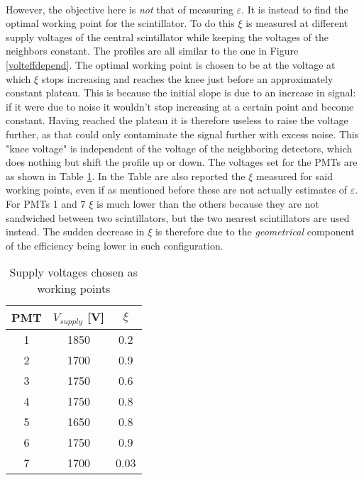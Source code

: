 \documentclass[10pt,a4paper,twocolumn]{article}
\begin{document}
\\
However, the objective here is \textit{not} that of measuring $\varepsilon$. It is instead to find the optimal working point for the scintillator. To do this $\xi$ is measured at different supply voltages of the central scintillator while keeping the voltages of the neighbors constant. The profiles are all similar to the one in Figure \ref{volteffdepend}. The optimal working point is chosen to be at the voltage at which $\xi$ stops increasing and reaches the knee just before an approximately constant plateau. This is because the initial slope is due to an increase in signal: if it were due to noise it wouldn't stop increasing at a certain point and become constant. Having reached the plateau it is therefore useless to raise the voltage further, as that could only contaminate the signal further with excess noise. This "knee voltage" is independent of the voltage of the neighboring detectors, which does nothing but shift the profile up or down. The voltages set for the PMTs are as shown in Table \ref{voltworkpoints}. In the Table are also reported the $\xi$ measured for said working points, even if as mentioned before these are not actually estimates of $\varepsilon$. For PMTs 1 and 7 $\xi$ is much lower than the others because they are not sandwiched between two scintillators, but the two nearest scintillators are used instead. The sudden decrease in $\xi$ is therefore due to the \textit{geometrical} component of the efficiency being lower in such configuration.

\begin{table}[h]
\centering
\begin{tabular}{c|c|c}
PMT & $V_{supply}$ [V] & $\xi$  \\
\hline
1 &  1850  &  0.2   \\
2 &  1700  &  0.9   \\
3 &  1750  &  0.6   \\
4 &  1750  &  0.8   \\
5 &  1650  &  0.8   \\
6 &  1750  &  0.9   \\
7 &  1700  &  0.03   \\
\end{tabular} 
\caption{Supply voltages chosen as working points}
\label{voltworkpoints}
\end{table}
\end{document}

